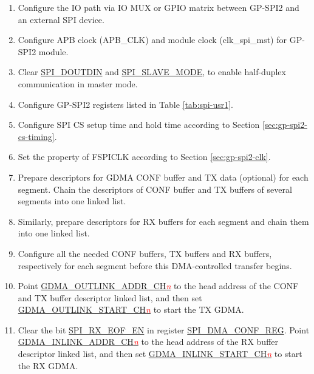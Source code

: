 \documentclass[main\_\_EN.tex]{subfiles}
\begin{document}
 \begin{enumerate}
    \item Configure the IO path via IO MUX or GPIO matrix between GP-SPI2 and an external SPI device.
    \item Configure APB clock (APB\_CLK) and module clock (clk\_spi\_mst) for GP-SPI2 module.

    \item Clear \hyperref[fielddesc:SPIDOUTDIN]{SPI\_DOUTDIN} and \hyperref[fielddesc:SPISLAVEMODE]{SPI\_SLAVE\_MODE}, to enable half-duplex communication in master mode.

    \item Configure GP-SPI2 registers listed in Table \ref{tab:spi-usr1}.

    \item Configure SPI CS setup time and hold time according to Section \ref{sec:gp-spi2-cs-timing}.

    \item Set the property of FSPICLK according to Section \ref{sec:gp-spi2-clk}.

   \item Prepare descriptors for GDMA CONF buffer and TX data (optional) for each segment. Chain the descriptors of CONF buffer and TX buffers of several segments into one linked list.

   \item Similarly, prepare descriptors for RX buffers for each segment and chain them into one linked list.
   \item Configure all the needed CONF buffers, TX buffers and RX buffers, respectively for each segment before this DMA-controlled transfer begins.

   \item Point \hyperref[fielddesc:DMAOUTLINKADDRCHN]{GDMA\_OUTLINK\_ADDR\_CH\textcolor{red}{\it{n}}} to the head address of the CONF and TX buffer descriptor linked list, and then set \hyperref[fielddesc:DMAOUTLINKSTARTCHN]{GDMA\_OUTLINK\_START\_CH\textcolor{red}{\it{n}}} to start the TX GDMA.

   \item Clear the bit \hyperref[fielddesc:SPIRXEOFEN]{SPI\_RX\_EOF\_EN} in register \hyperref[regdesc:SPIDMACONFREG]{SPI\_DMA\_CONF\_REG}. Point \hyperref[fielddesc:DMAINLINKADDRCHN]{GDMA\_INLINK\_ADDR\_CH\textcolor{red}{\it{n}}} to the head address of the RX buffer descriptor linked list, and then set \hyperref[fielddesc:DMAINLINKSTARTCHN]{GDMA\_INLINK\_START\_CH\textcolor{red}{\it{n}}} to start the RX GDMA.


\end{enumerate}
\end{document}
